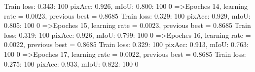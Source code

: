 Train loss: 0.343: 100%
pixAcc: 0.926, mIoU: 0.800: 100%
  0%
=>Epoches 14, learning rate = 0.0023,                 previous best = 0.8685
Train loss: 0.329: 100%
pixAcc: 0.929, mIoU: 0.805: 100%
  0%
=>Epoches 15, learning rate = 0.0023,                 previous best = 0.8685
Train loss: 0.319: 100%
pixAcc: 0.926, mIoU: 0.799: 100%
  0%
=>Epoches 16, learning rate = 0.0022,                 previous best = 0.8685
Train loss: 0.329: 100%
pixAcc: 0.913, mIoU: 0.763: 100%
  0%
=>Epoches 17, learning rate = 0.0022,                 previous best = 0.8685
Train loss: 0.275: 100%
pixAcc: 0.933, mIoU: 0.822: 100%
  0%
